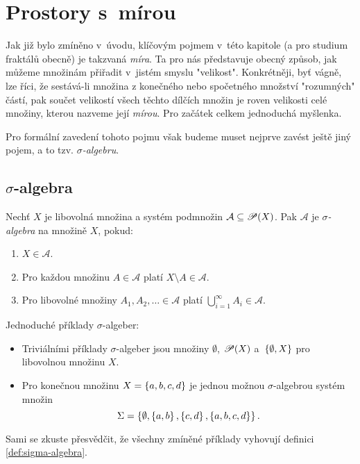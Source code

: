 \section{Prostory s~mírou}\label{sec:prostory-s-mirou}

Jak již bylo zmíněno v~úvodu, klíčovým pojmem v~této kapitole (a pro studium fraktálů obecně) je takzvaná \emph{míra}. Ta pro nás představuje obecný způsob, jak můžeme množinám přiřadit v~jistém smyslu "velikost". Konkrétněji, byť vágně, lze říci, že sestává-li množina z konečného nebo spočetného množství "rozumných" částí, pak součet velikostí všech těchto dílčích množin je roven velikosti celé množiny, kterou nazveme její \emph{mírou}. Pro začátek celkem jednoduchá myšlenka.

Pro formální zavedení tohoto pojmu však budeme muset nejprve zavést ještě jiný pojem, a to tzv. \emph{$\sigma$-algebru}.

\subsection{$\sigma$-algebra}\label{subsec:sigma-algebra}

\begin{definition}\label{def:sigma-algebra}
    Nechť $X$ je libovolná množina a systém podmnožin $\mathcal{A}\subseteq\mathscr{P}(X)$. Pak $\mathcal{A}$ je \emph{$\sigma$-algebra} na množině $X$, pokud:
    \begin{enumerate}[label=(\roman*)]
        \item\label{def:sigma-algebra-podm1} $X\in\mathcal{A}$.
        \item\label{def:sigma-algebra-podm2} Pro každou množinu $A\in\mathcal{A}$ platí $X\setminus A\in\mathcal{A}$.
        \item\label{def:sigma-algebra-podm3} Pro libovolné množiny $A_1,A_2,\ldots\in\mathcal{A}$ platí $\bigcup_{i=1}^\infty A_i\in\mathcal{A}$.
    \end{enumerate}
\end{definition}

\begin{example}
    Jednoduché příklady $\sigma$-algeber:
    \begin{itemize}
        \item Triviálními příklady $\sigma$-algeber jsou množiny $\emptyset$, $\mathscr{P}(X)$ a~$\left\{\emptyset,X\right\}$ pro libovolnou množinu $X$.
        \item Pro konečnou množinu $X=\left\{a,b,c,d\right\}$ je jednou možnou $\sigma$-algebrou systém množin
        \[\Sigma=\left\{\emptyset,\left\{a,b\right\},\left\{c,d\right\},\left\{a,b,c,d\right\}\right\}.\]
    \end{itemize}
    Sami se zkuste přesvědčit, že všechny zmíněné příklady vyhovují definici \ref{def:sigma-algebra}.
\end{example}

